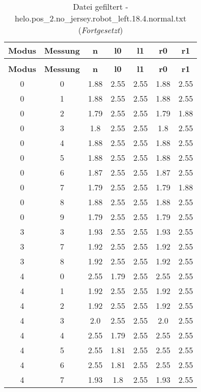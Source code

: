 \begin{longtable}{|c|c||c||c|c||c|c|}
	\caption{Datei gefiltert - helo.pos\_2.no\_jersey.robot\_left.18.4.normal.txt} \label{tab:helo.pos-2.no-jersey.robot-left.18.4.normal.txt} \\ \hline
	\textbf{Modus} & \textbf{Messung} & \textbf{n} & \textbf{l0} & \textbf{l1} & \textbf{r0} & \textbf{r1}\\ \hline
	\endfirsthead
	\caption[]{Datei gefiltert - helo.pos\_2.no\_jersey.robot\_left.18.4.normal.txt (\emph{Fortgesetzt})} \\ \hline
	\textbf{Modus} & \textbf{Messung} & \textbf{n} & \textbf{l0} & \textbf{l1} & \textbf{r0} & \textbf{r1}\\ \hline
	\endhead
	0 & 0 & 1.88 & 2.55 & 2.55 & 1.88 & 2.55 \\ \hline
	0 & 1 & 1.88 & 2.55 & 2.55 & 1.88 & 2.55 \\ \hline
	0 & 2 & 1.79 & 2.55 & 2.55 & 1.79 & 1.88 \\ \hline
	0 & 3 & 1.8 & 2.55 & 2.55 & 1.8 & 2.55 \\ \hline
	0 & 4 & 1.88 & 2.55 & 2.55 & 1.88 & 2.55 \\ \hline
	0 & 5 & 1.88 & 2.55 & 2.55 & 1.88 & 2.55 \\ \hline
	0 & 6 & 1.87 & 2.55 & 2.55 & 1.87 & 2.55 \\ \hline
	0 & 7 & 1.79 & 2.55 & 2.55 & 1.79 & 1.88 \\ \hline
	0 & 8 & 1.88 & 2.55 & 2.55 & 1.88 & 2.55 \\ \hline
	0 & 9 & 1.79 & 2.55 & 2.55 & 1.79 & 2.55 \\ \hline
	3 & 3 & 1.93 & 2.55 & 2.55 & 1.93 & 2.55 \\ \hline
	3 & 7 & 1.92 & 2.55 & 2.55 & 1.92 & 2.55 \\ \hline
	3 & 8 & 1.92 & 2.55 & 2.55 & 1.92 & 2.55 \\ \hline
	4 & 0 & 2.55 & 1.79 & 2.55 & 2.55 & 2.55 \\ \hline
	4 & 1 & 1.92 & 2.55 & 2.55 & 1.92 & 2.55 \\ \hline
	4 & 2 & 1.92 & 2.55 & 2.55 & 1.92 & 2.55 \\ \hline
	4 & 3 & 2.0 & 2.55 & 2.55 & 2.0 & 2.55 \\ \hline
	4 & 4 & 2.55 & 1.79 & 2.55 & 2.55 & 2.55 \\ \hline
	4 & 5 & 2.55 & 1.81 & 2.55 & 2.55 & 2.55 \\ \hline
	4 & 6 & 2.55 & 1.81 & 2.55 & 2.55 & 2.55 \\ \hline
	4 & 7 & 1.93 & 1.8 & 2.55 & 1.93 & 2.55 \\ \hline

\end{longtable}
